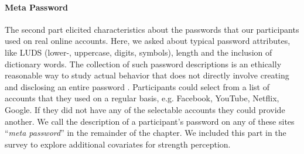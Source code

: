 \paragraph{Meta Password} The second part elicited characteristics about the passwords that our participants used on real online accounts. Here, we asked about typical password attributes, like LUDS (lower-, uppercase, digits, symbols), length and the inclusion of dictionary words. The collection of such password descriptions is an ethically reasonable way to study actual behavior that does not directly involve creating and disclosing an entire password \cite{VonZezschwitz2013SurvivalShortest}. Participants could select from a list of accounts that they used on a regular basis, e.g. Facebook, YouTube, Netflix, Google. If they did not have any of the selectable accounts they could provide another. We call the description of a participant's password on any of these sites ``\textit{meta password}'' in the remainder of the chapter. We included this part in the survey to explore additional covariates for strength perception.




